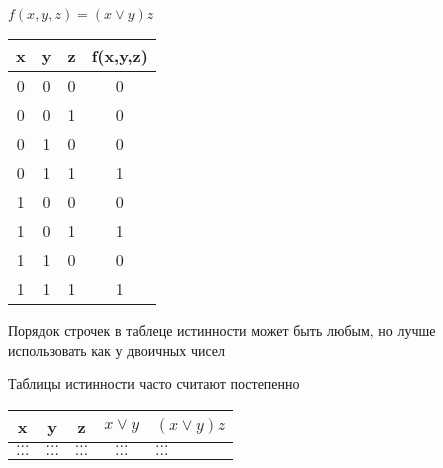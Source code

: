 \documentclass[russian]{lecture-notes}
\begin{document}
\begin{sloppypar}
        \begin{example}
            $f(x, y, z) = (x \lor y)z$

            \begin{table}[h!]
                \centering
                \begin{tabular}{|c|c|c|c|}
                    \hline
                    x & y & z & f(x,y,z) \\ \hline
                    0    & 0 & 0 & 0        \\ \hline
                    0    & 0 & 1 & 0        \\ \hline
                    0    & 1 & 0 & 0        \\ \hline
                    0    & 1 & 1 & 1        \\ \hline
                    1    & 0 & 0 & 0        \\ \hline
                    1    & 0 & 1 & 1        \\ \hline
                    1    & 1 & 0 & 0        \\ \hline
                    1    & 1 & 1 & 1        \\ \hline
                \end{tabular}
            \end{table}
        \end{example}

        \begin{remark}
            Порядок строчек в таблеце истинности может быть любым, но лучше использовать как у двоичных чисел
        \end{remark}

        \begin{proposition}
            Таблицы истинности часто считают постепенно

            \begin{table}[h!]
                \centering
                \begin{tabular}{|c|c|c|c|l|}
                    \hline
                    x    & y       & z       & $x \lor y$ & $(x \lor y)z$ \\ \hline
                    $\dots$ & $\dots$ & $\dots$ & $\dots$    & $\dots$       \\ \hline
                    $\dots$ & $\dots$ & $\dots$ & $\dots$    & $\dots$       \\ \hline
                \end{tabular}
            \end{table}
        \end{proposition}


\end{sloppypar}
\end{document}
